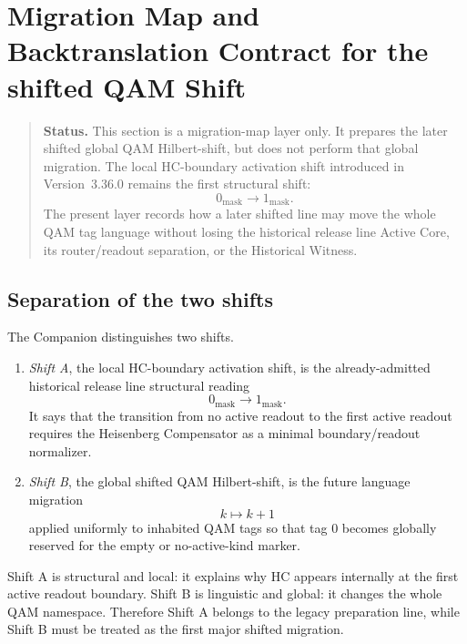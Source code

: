 \section{ Migration Map and Backtranslation Contract for the shifted QAM Shift}
\label{sec:v3370-migration-map-backtranslation-contract}

\begin{quote}\small
\noindent\textbf{Status.}
This section is a migration-map layer only. It prepares the later shifted global
QAM Hilbert-shift, but does not perform that global migration. The local
HC-boundary activation shift introduced in Version~3.36.0 remains the first
structural shift:
\[
 0_{\mathrm{mask}}\longrightarrow 1_{\mathrm{mask}}.
\]
The present layer records how a later shifted line may move the whole QAM tag
language without losing the historical release line Active Core, its router/readout separation,
or the Historical Witness.
\end{quote}

\subsection{Separation of the two shifts}
\label{subsec:v3370-two-shift-separation}

\begin{definition}
\label{def:v3370-local-boundary-shift-versus-global-language-shift}
The Companion distinguishes two shifts.
\begin{enumerate}[leftmargin=*]
 \item \emph{Shift A}, the local HC-boundary activation shift, is the
 already-admitted historical release line structural reading
 \[
 0_{\mathrm{mask}}\longrightarrow 1_{\mathrm{mask}}.
 \]
 It says that the transition from no active readout to the first active
 readout requires the Heisenberg Compensator as a minimal boundary/readout
 normalizer.

 \item \emph{Shift B}, the global shifted QAM Hilbert-shift, is the future
 language migration
 \[
 k\longmapsto k+1
 \]
 applied uniformly to inhabited QAM tags so that tag $0$ becomes globally
 reserved for the empty or no-active-kind marker.
\end{enumerate}
\end{definition}

\begin{remark}
\label{rem:v3370-shift-a-legacy-shift-b-shifted}
Shift A is structural and local: it explains why HC appears internally at the
first active readout boundary. Shift B is linguistic and global: it changes
the whole QAM namespace. Therefore Shift A belongs to the legacy preparation
line, while Shift B must be treated as the first major shifted migration.
\end{remark}

